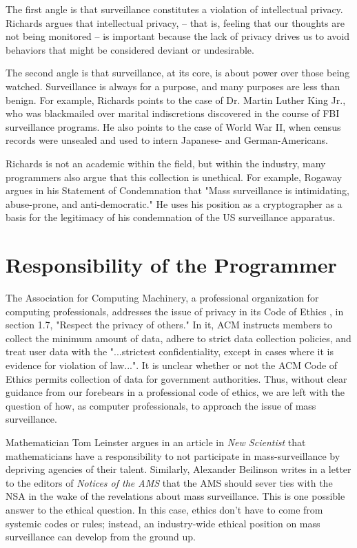 \documentclass{sig-alternate-05-2015}
\begin{document}
The first angle is that surveillance constitutes a violation of intellectual
privacy. Richards argues that intellectual privacy, -- that is, feeling that
our thoughts are not being monitored -- is important because the lack of
privacy drives us to avoid behaviors that might be considered deviant or
undesirable.

The second angle is that surveillance, at its core, is about power over those
being watched. Surveillance is always for a purpose, and many purposes are less
than benign. For example, Richards points to the case of Dr. Martin Luther King
Jr., who was blackmailed over marital indiscretions discovered in the course of
FBI surveillance programs. He also points to the case of World War II, when
census records were unsealed and used to intern Japanese- and German-Americans.

Richards is not an academic within the field, but within the industry, many
programmers also argue that this collection is unethical. For example, Rogaway
argues in his Statement of Condemnation \cite{rogaway} that "Mass surveillance
is intimidating, abuse-prone, and anti-democratic." He uses his position as a
cryptographer as a basis for the legitimacy of his condemnation of the US 
surveillance apparatus.

\section{Responsibility of the Programmer}

The Association for Computing Machinery, a professional organization for
computing professionals, addresses the issue of privacy in its Code of Ethics
\cite{ethics}, in section 1.7, "Respect the privacy of others." In it, ACM
instructs members to collect the minimum amount of data, adhere to strict data
collection policies, and treat user data with the "...strictest
confidentiality, except in cases where it is evidence for violation of law...".
It is unclear whether or not the ACM Code of Ethics permits collection of data
for government authorities. Thus, without clear guidance from our forebears in
a professional code of ethics, we are left with the question of how, as
computer professionals, to approach the issue of mass surveillance.

Mathematician Tom Leinster argues in an article in \textit{New Scientist}
\cite{leinster} that mathematicians have a responsibility to not participate in
mass-surveillance by depriving agencies of their talent. Similarly, Alexander
Beilinson writes in a letter \cite{beilinson} to the editors of \textit{Notices
of the AMS} that the AMS should sever ties with the NSA in the wake of the
revelations about mass surveillance. This is one possible answer to the ethical
question. In this case, ethics don't have to come from systemic codes or rules;
instead, an industry-wide ethical position on mass surveillance can develop
from the ground up.
\end{document}

